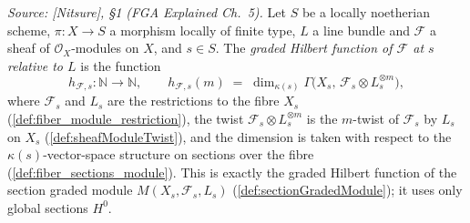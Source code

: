 \begin{definition}
  \label{def:fiber_hilbert_function}
  \textit{Source: [Nitsure], \S 1 (FGA Explained Ch.~5).}
  Let \(S\) be a locally noetherian scheme, \(\pi : X \to S\) a morphism
  locally of finite type, \(L\) a line bundle and \(\mathcal{F}\) a sheaf of
  \(\mathcal{O}_X\)-modules on \(X\), and \(s \in S\). The \emph{graded
  Hilbert function of \(\mathcal{F}\) at \(s\) relative to \(L\)} is the
  function
  \[
    h_{\mathcal{F},s} : \mathbb{N} \longrightarrow \mathbb{N}, \qquad
    h_{\mathcal{F},s}(m) \;=\;
    \dim_{\kappa(s)} \Gamma\bigl(X_s,\, \mathcal{F}_s \otimes L_s^{\otimes m}\bigr),
  \]
  where \(\mathcal{F}_s\) and \(L_s\) are the restrictions to the fibre
  \(X_s\) (\cref{def:fiber_module_restriction}), the twist
  \(\mathcal{F}_s \otimes L_s^{\otimes m}\) is the \(m\)-twist of
  \(\mathcal{F}_s\) by \(L_s\) on \(X_s\) (\cref{def:sheafModuleTwist}), and
  the dimension is taken with respect to the \(\kappa(s)\)-vector-space
  structure on sections over the fibre (\cref{def:fiber_sections_module}).
  This is exactly the graded Hilbert function of the section graded module
  \(M(X_s, \mathcal{F}_s, L_s)\) (\cref{def:sectionGradedModule}); it uses
  only global sections \(H^0\).
\end{definition}


